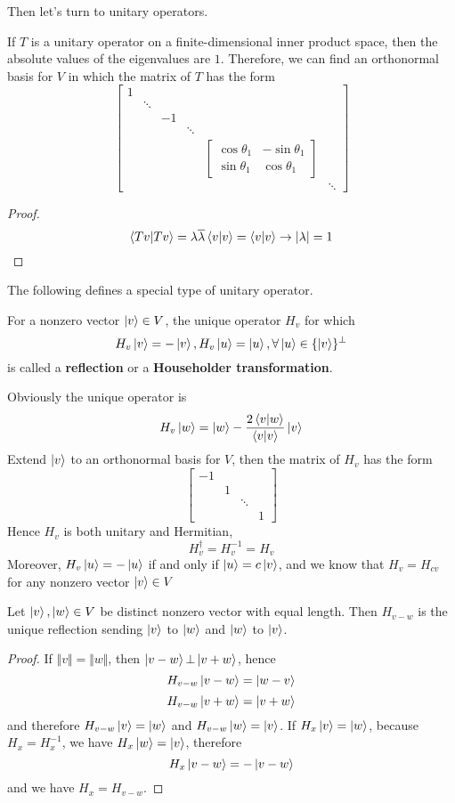 \documentclass{article}
\begin{document}
Then let's turn to unitary operators.
\begin{thm}
	If $T$ is a unitary operator on a finite-dimensional inner product space, then the absolute values of the eigenvalues are $1$. Therefore, we can find an orthonormal basis for $V$ in which the matrix of $T$ has the form
	\[\begin{bmatrix}
		1& & & & &\\
		 &\ddots& & & &\\
		 & &-1& & &\\
		 & & &\ddots& &\\
		 & & & &\begin{bmatrix}
		 	\cos\theta_1&-\sin\theta_1\\
		 	\sin\theta_1&\cos\theta_1
		 \end{bmatrix}&\\
		 & & & & &\ddots
	\end{bmatrix}\]
\end{thm}
\begin{proof}
	\[\braket{Tv|Tv}=\lambda\overline{\lambda}\braket{v|v}=\braket{v|v}\rightarrow|\lambda|=1\]
\end{proof}
The following defines a special type of unitary operator.
\begin{dde}
	For a nonzero vector $\ket{v}\in V$, the unique operator $H_v$ for which
	\[H_v\ket{v}=-\ket{v},H_v\ket{u}=\ket{u},\forall\ket{u}\in\{\ket{v}\}^\bot\]
	is called a \textbf{reflection} or a \textbf{Householder transformation}.
\end{dde}
Obviously the unique operator is 
\[H_v\ket{w}=\ket{w}-\frac{2\braket{v|w}}{\braket{v|v}}\ket{v}\]
\indent Extend $\ket{v}$ to an orthonormal basis for $V$, then the matrix of $H_v$ has the form
\[\begin{bmatrix}
	-1&&&\\
	&1&&\\
	&&\ddots&\\
	&&&1
\end{bmatrix}\]
Hence $H_v$ is both unitary and Hermitian,
\[H_v^\dagger=H_v^{-1}=H_v\]
\indent Moreover, $H_v\ket{u}=-\ket{u}$ if and only if $\ket{u}=c\ket{v}$, and we know that $H_v=H_{cv}$ for any nonzero vector $\ket{v}\in V$
\begin{thm}
	Let $\ket{v},\ket{w}\in V$ be distinct nonzero vector with equal length. Then $H_{v-w}$ is the unique reflection sending $\ket{v}$ to $\ket{w}$ and $\ket{w}$ to $\ket{v}$.
\end{thm}
\begin{proof}
	If $\Vert v\Vert=\Vert w\Vert$, then $\ket{v-w}\bot\ket{v+w}$, hence
	\[H_{v-w}\ket{v-w}=\ket{w-v}\]
	\[H_{v-w}\ket{v+w}=\ket{v+w}\]
	and therefore $H_{v-w}\ket{v}=\ket{w}$ and $H_{v-w}\ket{w}=\ket{v}$. If $H_x\ket{v}=\ket{w}$, because $H_x=H_x^{-1}$, we have $H_x\ket{w}=\ket{v}$, therefore 
	\[H_x\ket{v-w}=-\ket{v-w}\]
	and we have $H_x=H_{v-w}$.
\end{proof}
\end{document}

